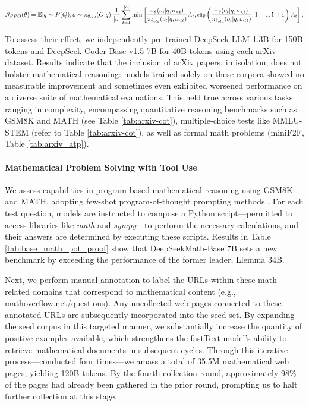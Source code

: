\begin{itemize}[topsep=0pt]
\begin{equation}
\footnotesize
                \mathcal{J}_{PPO}(\theta) = \mathbb{E}{[q \sim P(Q), o \sim \pi_{\theta_{old}}(O|q)]} \frac{1}{|o|} \sum_{t=1}^{|o|} \min \left[ \frac{\pi_\theta(o_{t} | q, o_{<t})}{\pi_{\theta_{old}}(o_{t} | q, o_{<t})} A_{t}, \text{clip} \left( \frac{\pi_\theta(o_{t} | q, o_{<t})}{\pi_{\theta_{old}}(o_{t} | q, o_{<t})}, 1 - \varepsilon, 1 + \varepsilon \right)  A_{t} \right] ,
\end{equation}

To assess their effect, we independently pre-trained DeepSeek-LLM 1.3B for 150B tokens and DeepSeek-Coder-Base-v1.5 7B for 40B tokens using each arXiv dataset. Results indicate that the inclusion of arXiv papers, in isolation, does not bolster mathematical reasoning: models trained solely on these corpora showed no measurable improvement and sometimes even exhibited worsened performance on a diverse suite of mathematical evaluations. This held true across various tasks ranging in complexity, encompassing quantitative reasoning benchmarks such as GSM8K and MATH (see Table \ref{tab:arxiv-cot}), multiple-choice tests like MMLU-STEM (refer to Table \ref{tab:arxiv-cot}), as well as formal math problems (miniF2F, Table \ref{tab:arxiv_atp}).

\paragraph{Mathematical Problem Solving with Tool Use}  
We assess capabilities in program-based mathematical reasoning using GSM8K and MATH, adopting few-shot program-of-thought prompting methods \citep{pot,pal}. For each test question, models are instructed to compose a Python script—permitted to access libraries like \textit{math} and \textit{sympy}—to perform the necessary calculations, and their answers are determined by executing these scripts. Results in Table \ref{tab:base_math_pot_proof} show that DeepSeekMath-Base 7B sets a new benchmark by exceeding the performance of the former leader, Llemma 34B.

Next, we perform manual annotation to label the URLs within these math-related domains that correspond to mathematical content (e.g., \url{mathoverflow.net/questions}). Any uncollected web pages connected to these annotated URLs are subsequently incorporated into the seed set. By expanding the seed corpus in this targeted manner, we substantially increase the quantity of positive examples available, which strengthens the fastText model's ability to retrieve mathematical documents in subsequent cycles. Through this iterative process—conducted four times—we amass a total of 35.5M mathematical web pages, yielding 120B tokens. By the fourth collection round, approximately 98\% of the pages had already been gathered in the prior round, prompting us to halt further collection at this stage.


\end{itemize}
